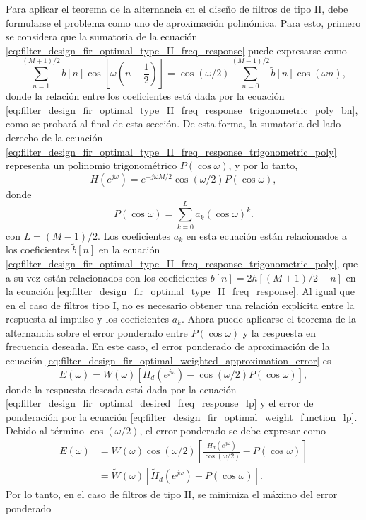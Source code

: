 \documentclass[a4paper]{report}
\begin{document}
Para aplicar el teorema de la alternancia en el diseño de filtros de tipo II, debe formularse el problema como uno de aproximación polinómica. Para esto, primero se considera que la sumatoria de la ecuación \ref{eq:filter_design_fir_optimal_type_II_freq_response} puede expresarse como
\begin{equation}\label{eq:filter_design_fir_optimal_type_II_freq_response_trigonometric_poly}
 \sum_{n=1}^{(M+1)/2}b[n]\cos\left[\omega\left(n-\frac{1}{2}\right)\right]=
 \cos(\omega/2)\sum_{n=0}^{(M-1)/2}\tilde{b}[n]\cos(\omega n),
\end{equation}
donde la relación entre los coeficientes está dada por la ecuación \ref{eq:filter_design_fir_optimal_type_II_freq_response_trigonometric_poly_bn}, como se probará al final de esta sección. De esta forma, la sumatoria del lado derecho de la ecuación \ref{eq:filter_design_fir_optimal_type_II_freq_response_trigonometric_poly} representa un polinomio trigonométrico \(P(\cos\omega)\), y por lo tanto,
\[
 H(e^{j\omega})=e^{-j\omega M/2}\cos(\omega/2)P(\cos\omega),
\]
donde
\[
 P(\cos\omega)=\sum_{k=0}^La_k(\cos\omega)^k.
\]
con \(L=(M-1)/2\). Los coeficientes \(a_k\) en esta ecuación están relacionados a los coeficientes \(\tilde{b}[n]\) en la ecuación \ref{eq:filter_design_fir_optimal_type_II_freq_response_trigonometric_poly}, que a su vez están relacionados con los coeficientes \(b[n]=2h[(M+1)/2-n]\) en la ecuación \ref{eq:filter_design_fir_optimal_type_II_freq_response}. Al igual que en el caso de filtros tipo I, no es necesario obtener una relación explícita entre la respuesta al impulso y los coeficientes \(a_k\). Ahora puede aplicarse el teorema de la alternancia sobre el error ponderado entre \(P(\cos\omega)\) y la respuesta en frecuencia deseada. En este caso, el error ponderado de aproximación de la ecuación \ref{eq:filter_design_fir_optimal_weighted_approximation_error} es
\[
 E(\omega)=W(\omega)[H_d(e^{j\omega})-\cos(\omega/2)P(\cos\omega)],
\]
donde la respuesta deseada está dada por la ecuación \ref{eq:filter_design_fir_optimal_desired_freq_response_lp} y el error de ponderación por la ecuación \ref{eq:filter_design_fir_optimal_weight_function_lp}. Debido al término \(\cos(\omega/2)\), el error ponderado se debe expresar como
\begin{align*}
 E(\omega)&=W(\omega)\cos(\omega/2)\left[\frac{H_d(e^{j\omega})}{\cos(\omega/2)}-P(\cos\omega)\right]\\
  &=\tilde{W}(\omega)[\tilde{H}_d(e^{j\omega})-P(\cos\omega)].
\end{align*}
Por lo tanto, en el caso de filtros de tipo II, se minimiza el máximo del error ponderado
\end{document}
